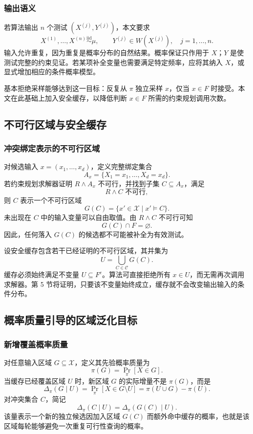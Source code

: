 \documentclass[UTF8, fontset=none, a4paper, 12pt]{ctexart}
\newcommand{\InputSpace}{\mathcal{X}}
\begin{document}
\subsubsection{输出语义}

若算法输出 $n$ 个测试 $(X^{(j)},Y^{(j)})$，本文要求
\[
  X^{(1)},\ldots,X^{(n)}
  \overset{\mathrm{iid}}{\sim}\mu,
  \qquad
  Y^{(j)}\in W(X^{(j)}),
  \quad j=1,\ldots,n.
\]
输入允许重复，因为重复是概率分布的自然结果。概率保证只作用于 $X$；$Y$ 是使测试完整的约束见证。若某项补全变量也需要满足特定频率，应将其纳入 $X$，或显式增加相应的条件概率模型。

基本拒绝采样能够达到这一目标：反复从 $\pi$ 独立采样 $x$，仅当 $x\in F$ 时接受。本文在此基础上加入安全缓存，以降低判断 $x\in F$ 所需的约束规划调用次数。

\subsection{不可行区域与安全缓存}

\subsubsection{冲突绑定表示的不可行区域}

对候选输入 $x=(x_1,\ldots,x_d)$，定义完整绑定集合
\[
  A_x=\{X_1=x_1,\ldots,X_d=x_d\}.
\]
若约束规划求解器证明 $R\land A_x$ 不可行，并找到子集 $C\subseteq A_x$，满足
\[
  R\land C\text{ 不可行},
\]
则 $C$ 表示一个不可行区域
\[
  G(C)=\{x'\in\InputSpace\mid x'\models C\}.
\]
未出现在 $C$ 中的输入变量可以自由取值。由 $R\land C$ 不可行可知
\[
  G(C)\cap F=\varnothing.
\]
因此，任何落入 $G(C)$ 的候选都不可能被补全为有效测试。

设安全缓存包含若干已经证明的不可行区域，其并集为
\[
  U=\bigcup_{C\in\mathcal{C}}G(C).
\]
缓存必须始终满足不变量 $U\subseteq F^c$。算法可直接拒绝所有 $x\in U$，而无需再次调用求解器。第 5 节将证明，只要该不变量始终成立，缓存就不会改变输出输入的条件分布。

\subsection{概率质量引导的区域泛化目标}

\subsubsection{新增覆盖概率质量}

对任意输入区域 $G\subseteq\InputSpace$，定义其先验概率质量为
\[
  \pi(G)=\Pr_{\pi}[X\in G].
\]
当缓存已经覆盖区域 $U$ 时，新区域 $G$ 的实际增量不是 $\pi(G)$，而是
\[
  \Delta_{\pi}(G\mid U)
  =\Pr_{\pi}[X\in G\setminus U]
  =\pi(U\cup G)-\pi(U).
\]
对冲突集合 $C$，简记
\[
  \Delta_{\pi}(C\mid U)
  =\Delta_{\pi}(G(C)\mid U).
\]
该量表示一个新的独立候选因加入区域 $G(C)$ 而额外命中缓存的概率，也就是该区域每轮能够避免一次重复可行性查询的概率。
\end{document}
